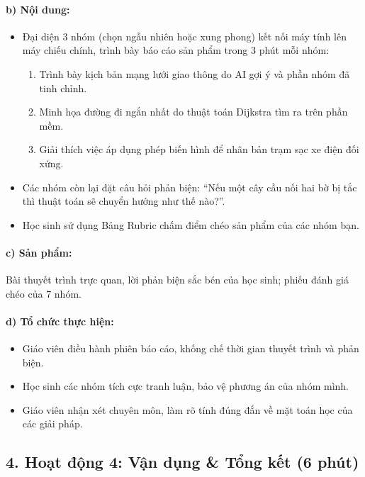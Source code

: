 \documentclass[12pt, a4paper]{article}
\begin{document}
\paragraph{b) Nội dung:}
\begin{itemize}[leftmargin=0.6cm]
    \item Đại diện 3 nhóm (chọn ngẫu nhiên hoặc xung phong) kết nối máy tính lên máy chiếu chính, trình bày báo cáo sản phẩm trong 3 phút mỗi nhóm:
    \begin{enumerate}[leftmargin=0.5cm]
        \item Trình bày kịch bản mạng lưới giao thông do AI gợi ý và phần nhóm đã tinh chỉnh.
        \item Minh họa đường đi ngắn nhất do thuật toán Dijkstra tìm ra trên phần mềm.
        \item Giải thích việc áp dụng phép biến hình để nhân bản trạm sạc xe điện đối xứng.
    \end{enumerate}
    \item Các nhóm còn lại đặt câu hỏi phản biện: ``Nếu một cây cầu nối hai bờ bị tắc thì thuật toán sẽ chuyển hướng như thế nào?''.
    \item Học sinh sử dụng Bảng Rubric chấm điểm chéo sản phẩm của các nhóm bạn.
\end{itemize}

\paragraph{c) Sản phẩm:} Bài thuyết trình trực quan, lời phản biện sắc bén của học sinh; phiếu đánh giá chéo của 7 nhóm.

\paragraph{d) Tổ chức thực hiện:}
\begin{itemize}[leftmargin=0.8cm]
    \item Giáo viên điều hành phiên báo cáo, khống chế thời gian thuyết trình và phản biện.
    \item Học sinh các nhóm tích cực tranh luận, bảo vệ phương án của nhóm mình.
    \item Giáo viên nhận xét chuyên môn, làm rõ tính đúng đắn về mặt toán học của các giải pháp.
\end{itemize}

\subsection*{4. Hoạt động 4: Vận dụng \& Tổng kết (6 phút)}
\end{document}
